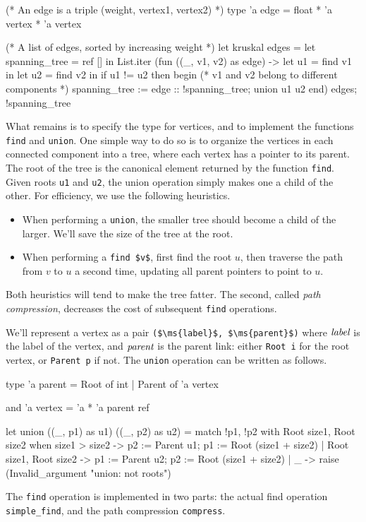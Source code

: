 \begin{ocaml}
(* An edge is a triple (weight, vertex1, vertex2) *)
type 'a edge = float * 'a vertex * 'a vertex

(* A list of edges, sorted by increasing weight *)
let kruskal edges =
   let spanning_tree = ref [] in
   List.iter (fun ((_, v1, v2) as edge) ->
      let u1 = find v1 in
      let u2 = find v2 in
      if u1 != u2 then begin
         (* v1 and v2 belong to different components *)
         spanning_tree := edge :: !spanning_tree;
         union u1 u2
      end) edges;
   !spanning_tree
\end{ocaml}
%
What remains is to specify the type for vertices, and to implement the functions \hbox{\lstinline/find/}
and \hbox{\lstinline/union/}.  One simple way to do so is to organize the vertices in each connected
component into a tree, where each vertex has a pointer to its parent.  The root of the tree is the
canonical element returned by the function \hbox{\lstinline/find/}.  Given roots \hbox{\lstinline/u1/}
and \hbox{\lstinline/u2/}, the union operation simply makes one a child of the other.
For efficiency, we use the following heuristics.

\begin{itemize}
\item When performing a \hbox{\lstinline/union/}, the smaller tree should become a child of the larger.
We'll save the size of the tree at the root.
\item
When performing a \hbox{\lstinline/find $v$/}, first find the root $u$, then traverse the path from $v$ to
$u$ a second time, updating all parent pointers to point to $u$.
\end{itemize}
%
Both heuristics will tend to make the tree fatter.  The second, called \emph{path compression},
decreases the cost of subsequent \hbox{\lstinline/find/} operations.

We'll represent a vertex as a pair \hbox{\lstinline/($\ms{label}$, $\ms{parent}$)/} where $\textit{label}$ is
the label of the vertex, and $\textit{parent}$ is the parent link: either \hbox{\lstinline/Root i/} for the
root vertex, or \hbox{\lstinline/Parent p/} if not.  The \hbox{\lstinline/union/} operation can be written as
follows.

\begin{ocaml}
type 'a parent =
   Root of int
 | Parent of 'a vertex

and 'a vertex = 'a * 'a parent ref

let union ((_, p1) as u1) ((_, p2) as u2) =
   match !p1, !p2 with
      Root size1, Root size2 when size1 > size2 ->
         p2 := Parent u1;
         p1 := Root (size1 + size2)
    | Root size1, Root size2 ->
         p1 := Parent u2;
         p2 := Root (size1 + size2)
    | _ ->
         raise (Invalid_argument "union: not roots")
\end{ocaml}
%
The \hbox{\lstinline/find/} operation is implemented in two parts: the actual find operation \hbox{\lstinline/simple_find/}, and the path compression \hbox{\lstinline/compress/}.

